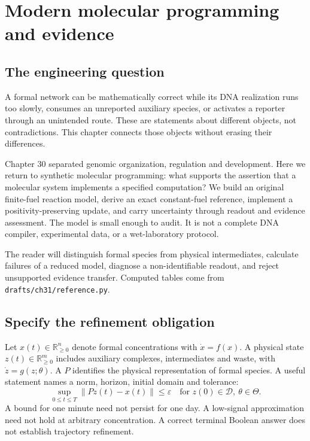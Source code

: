 \chapter{Modern molecular programming and evidence}
\label{ch:dna31}
\section{The engineering question}
A formal network can be mathematically correct while its DNA realization runs
too slowly, consumes an unreported auxiliary species, or activates a reporter
through an unintended route. These are statements about different objects,
not contradictions. This chapter connects those objects without erasing their
differences.

Chapter 30 separated genomic organization, regulation and development. Here we
return to synthetic molecular programming: what supports the assertion that a
molecular system implements a specified computation? We build an original
finite-fuel reaction model, derive an exact constant-fuel reference, implement a
positivity-preserving update, and carry uncertainty through readout and evidence
assessment. The model is small enough to audit. It is not a complete DNA compiler,
experimental data, or a wet-laboratory protocol.

The reader will distinguish formal species from physical intermediates,
calculate failures of a reduced model, diagnose a non-identifiable readout, and
reject unsupported evidence transfer. Computed tables come from
\texttt{drafts/ch31/reference.py}.

\section{Specify the refinement obligation}
Let $x(t)\in\mathbb R_{\ge0}^{n}$ denote formal concentrations with
$\dot x=f(x)$. A physical state $z(t)\in\mathbb R_{\ge0}^{m}$ includes auxiliary
complexes, intermediates and waste, with $\dot z=g(z;\theta)$. A
 $P$ identifies the physical representation of formal
species. A useful statement names a norm, horizon, initial domain and tolerance:
\begin{equation}
 \sup_{0\le t\le T}\|Pz(t)-x(t)\|\le\varepsilon
 \quad\text{for }z(0)\in\mathcal D,\ \theta\in\Theta.
 \label{eq:dna31-refinement}
\end{equation}
A bound for one minute need not persist for one day. A low-signal approximation
need not hold at arbitrary concentration. A correct terminal Boolean answer
does not establish trajectory refinement.

